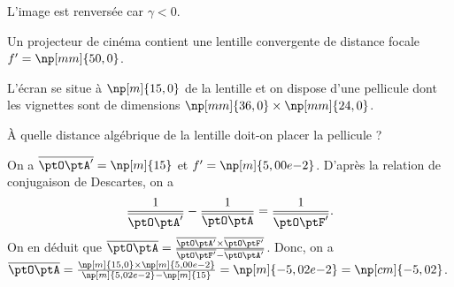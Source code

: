 \reponse{\reponseB{}}

\begin{corrige}
L'image est renversée car $\gamma< 0$.
\end{corrige}


\finEntrainement








\hauteurLargeurCadreReponse		{7mm}{3cm}
\initialisationEntrainement

Un projecteur de cinéma contient une lentille convergente de distance focale $f'=\np[mm]{50,0}$. 

L'écran se situe à $\np[m]{15,0}$ de la lentille et on dispose d'une pellicule dont les vignettes sont de dimensions $\np[mm]{36,0}\times\np[mm]{24,0}$.

\debutEntrainement


\begin{enonce}
À quelle distance algébrique de la lentille doit-on placer la pellicule ?
\end{enonce}


\begin{corrige}
On a $\overline{\ptO\ptA'}=\np[m]{15}$ et $f'=\np[m]{5,00e{-2}}$. D'après la relation de conjugaison de Descartes, on a
\[
\frac{1}{\overline{\ptO\ptA'}}-\frac{1}{\overline{\ptO\ptA}}=\frac{1}{\overline{\ptO\ptF'}}.
\]
On en déduit que $\overline{\ptO\ptA}=\frac{\overline{\ptO\ptA'}\times\overline{\ptO\ptF'}}{\overline{\ptO\ptF'}-\overline{\ptO\ptA'}}$. Donc, on a $\overline{\ptO\ptA}=\frac{\np[m]{15,0}\times\np[m]{5,00e{-2}}}{\np[m]{5,02e{-2}}-\np[m]{15}}=\np[m]{-5,02e{-2}}=\np[cm]{-5,02}$.
\end{corrige}

